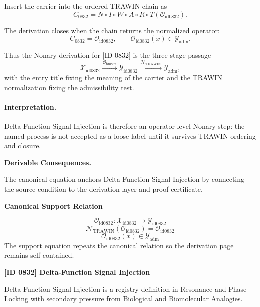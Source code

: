 Insert the carrier into the ordered TRAWIN chain as\[
C_{0832}=N\circ I\circ W\circ A\circ R\circ T(\mathcal{O}_{\mathrm{id0832}}).
\]

The derivation closes when the chain returns the normalized operator:\[
C_{0832}=\mathcal{O}_{\mathrm{id0832}},\qquad \mathcal{O}_{\mathrm{id0832}}(x)\in\mathcal{Y}_{\mathrm{adm}}.
\]

Thus the Nonary derivation for [ID 0832] is the three-stage passage
\[
\mathcal{X}_{\mathrm{id0832}}\xrightarrow{\,\mathcal{O}_{\mathrm{id0832}}\,} \mathcal{Y}_{\mathrm{id0832}}\xrightarrow{\,\mathcal{N}_{\mathrm{TRAWIN}}\,} \mathcal{Y}_{\mathrm{adm}},
\]
with the entry title fixing the meaning of the carrier and the TRAWIN normalization fixing the admissibility test.

\paragraph{Interpretation.} Delta-Function Signal Injection is therefore an operator-level Nonary step: the named process is not accepted as a loose label until it survives TRAWIN ordering and closure.

\par\vspace{0.35em}
\noindent\textbf{Derivable Consequences.}\quad
\begingroup
\footnotesize
\raggedright
The canonical equation anchors Delta-Function Signal Injection by connecting the source condition to the derivation layer and proof certificate.
\par\endgroup

\noindent\textbf{Canonical Support Relation}\par
\[
\mathcal{O}_{\mathrm{id0832}}:\mathcal{X}_{\mathrm{id0832}}\longrightarrow\mathcal{Y}_{\mathrm{id0832}}
\]
\[
\mathcal{N}_{\mathrm{TRAWIN}}(\mathcal{O}_{\mathrm{id0832}})=\mathcal{O}_{\mathrm{id0832}}
\]
\[
\mathcal{O}_{\mathrm{id0832}}(x)\in\mathcal{Y}_{\mathrm{adm}}
\]
\noindent The support equation repeats the canonical relation so the derivation page remains self-contained.\par

\clearpage
\noindent\textbf{[ID 0832] Delta-Function Signal Injection}\par
\vspace{0.35em}
\begingroup\small
{}
Delta-Function Signal Injection is a registry definition in Resonance and Phase Locking with secondary pressure from Biological and Biomolecular Analogies.

